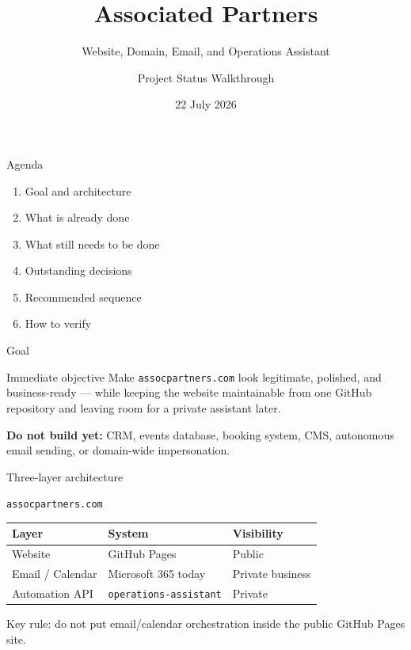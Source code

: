 \documentclass[aspectratio=169,11pt]{beamer}
\title{Associated Partners}
\subtitle{Website, Domain, Email, and Operations Assistant}
\author{Project Status Walkthrough}
\date{22 July 2026}
\begin{document}
\begin{frame}
  \titlepage
\end{frame}

\begin{frame}{Agenda}
  \begin{enumerate}
    \item Goal and architecture
    \item What is already done
    \item What still needs to be done
    \item Outstanding decisions
    \item Recommended sequence
    \item How to verify
  \end{enumerate}
\end{frame}

\begin{frame}{Goal}
  \begin{block}{Immediate objective}
    Make \texttt{assocpartners.com} look legitimate, polished, and
    business-ready --- while keeping the website maintainable from one
    GitHub repository and leaving room for a private assistant later.
  \end{block}

  \vspace{0.6em}
  \textbf{Do not build yet:} CRM, events database, booking system,
  CMS, autonomous email sending, or domain-wide impersonation.
\end{frame}

\begin{frame}{Three-layer architecture}
  \begin{center}
    \texttt{assocpartners.com}\\[0.8em]
    \begin{tabular}{lll}
      \toprule
      Layer & System & Visibility \\
      \midrule
      Website & GitHub Pages & Public \\
      Email / Calendar & Microsoft 365 today & Private business \\
      Automation API & \texttt{operations-assistant} & Private \\
      \bottomrule
    \end{tabular}
  \end{center}

  \vspace{1em}
  \alert{Key rule:} do not put email/calendar orchestration inside the
  public GitHub Pages site.
\end{frame}
\end{document}
